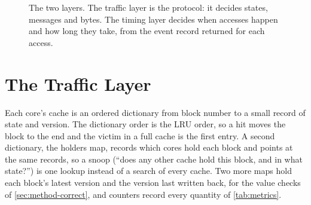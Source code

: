 \begin{figure}[htbp]
\begin{bigfig}[0.92]
\end{bigfig}
\caption[Simulator architecture]{The two layers. The traffic layer is the protocol:
it decides states, messages and bytes. The timing layer decides when accesses
happen and how long they take, from the event record returned for each access.}
\label{fig:sim-arch}
\end{figure}

\section{The Traffic Layer}
\label{sec:sim-traffic}
%

Each core's cache is an ordered dictionary from block number to a small record of
state and version. The dictionary order is the LRU order, so a hit moves the block
to the end and the victim in a full cache is the first entry. A second dictionary,
the holders map, records which cores hold each block and points at the same
records, so a snoop (``does any other cache hold this block, and in what state?'')
is one lookup instead of a search of every cache. Two more maps hold each block's
latest version and the version last written back, for the value checks of \cref{sec:method-correct}, and counters record every quantity of \cref{tab:metrics}.

